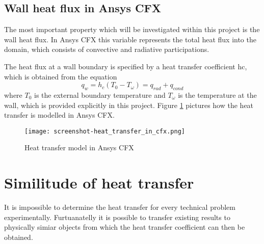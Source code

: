 \subsection{Wall heat flux in Ansys CFX}
The most important property which will be investigated within this project is the wall heat flux. In Ansys CFX this variable represents the total heat flux into the domain, which consists of convective and radiative participations.

The heat flux at a wall boundary is specified by a heat transfer coefficient hc, which is obtained from the equation
\begin{equation}
q_w = h_c (T_0 - T_{\omega} ) = q_{rad} + q_{cond}
\end{equation}
where $T_0$ is the external boundary temperature and $T_{\omega}$ is the temperature at the wall, which is provided explicitly in this project. Figure \ref{fig:ht_in_cfx} pictures how the heat transfer is modelled in Ansys CFX.
\begin{figure}[h]
\centering
\texttt{[image: screenshot-heat\_transfer\_in\_cfx.png]}
\caption{Heat transfer model in Ansys CFX}
\label{fig:ht_in_cfx}
\end{figure}
\section{Similitude of heat transfer}
It is impossible to determine the heat transfer for every technical problem experimentally. Furtuanatelly it is possible to transfer existing results to physically simiar objects from which the heat transfer coefficient can then be obtained.

